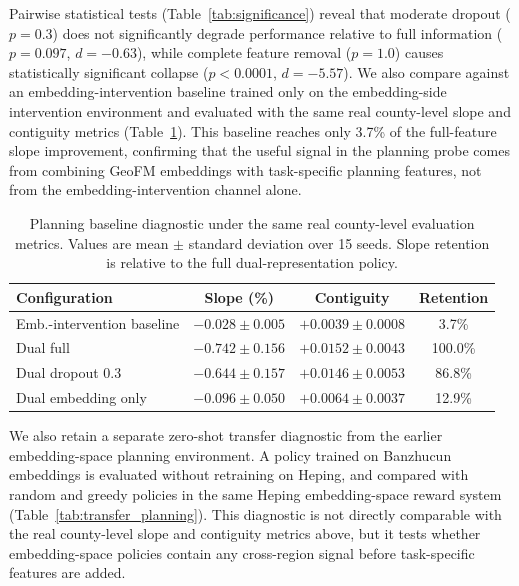 \documentclass{article}
\begin{document}
Pairwise statistical tests (Table~\ref{tab:significance}) reveal that moderate dropout ($p=0.3$) does not significantly degrade performance relative to full information ($p = 0.097$, $d = -0.63$), while complete feature removal ($p=1.0$) causes statistically significant collapse ($p < 0.0001$, $d = -5.57$). We also compare against an embedding-intervention baseline trained only on the embedding-side intervention environment and evaluated with the same real county-level slope and contiguity metrics (Table~\ref{tab:planning_baseline}). This baseline reaches only 3.7\% of the full-feature slope improvement, confirming that the useful signal in the planning probe comes from combining GeoFM embeddings with task-specific planning features, not from the embedding-intervention channel alone.

\begin{table}[htbp]
\centering
\caption{Planning baseline diagnostic under the same real county-level evaluation metrics. Values are mean $\pm$ standard deviation over 15 seeds. Slope retention is relative to the full dual-representation policy.}
\label{tab:planning_baseline}
\footnotesize
\begin{tabular}{lccc}
\toprule
Configuration & Slope (\%) & Contiguity & Retention \\
\midrule
Emb.-intervention baseline & $-0.028 \pm 0.005$ & $+0.0039 \pm 0.0008$ & 3.7\% \\
Dual full & $-0.742 \pm 0.156$ & $+0.0152 \pm 0.0043$ & 100.0\% \\
Dual dropout 0.3 & $-0.644 \pm 0.157$ & $+0.0146 \pm 0.0053$ & 86.8\% \\
Dual embedding only & $-0.096 \pm 0.050$ & $+0.0064 \pm 0.0037$ & 12.9\% \\
\bottomrule
\end{tabular}
\end{table}

We also retain a separate zero-shot transfer diagnostic from the earlier embedding-space planning environment. A policy trained on Banzhucun embeddings is evaluated without retraining on Heping, and compared with random and greedy policies in the same Heping embedding-space reward system (Table~\ref{tab:transfer_planning}). This diagnostic is not directly comparable with the real county-level slope and contiguity metrics above, but it tests whether embedding-space policies contain any cross-region signal before task-specific features are added.
\end{document}
